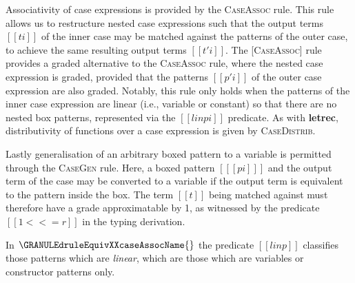 Associativity of case expressions is provided by the
\textsc{CaseAssoc} rule. This rule allows us to restructure nested
case expressions such that the output terms $[[ ti ]]$ of the inner
case may be matched against the patterns of the outer case, to achieve
the same resulting output terms $[[ t'i ]]$. The \textsc{[CaseAssoc]}
rule provides a graded alternative to the \textsc{CaseAssoc} rule,
where the nested case expression is graded, provided that the patterns
$[[ p'i ]]$ of the outer case expression are also graded. Notably,
this rule only holds when the patterns of the inner case expression
are linear (i.e., variable or constant) so that there are no nested box patterns, represented via the $[[ lin pi ]]$ predicate. As with \textbf{letrec}, distributivity of functions over a case expression is given by \textsc{CaseDistrib}.


Lastly generalisation of an arbitrary boxed pattern to a variable is permitted through the \textsc{CaseGen} rule. Here, a boxed pattern $[[  [pi] ]]$ and the output term of the case may be converted to a variable if the output term is equivalent to the pattern inside the box. The term $[[t]]$ being matched against must therefore have a grade approximatable by 1, as witnessed by the predicate $[[ 1 <<= r ]]$ in the typing derivation.



{}
%
In $\GRANULEdruleEquivXXcaseAssocName{}$
the predicate $[[ lin p ]]$ classifies those
patterns which are \emph{linear}, which are those which
are variables or constructor patterns only.

